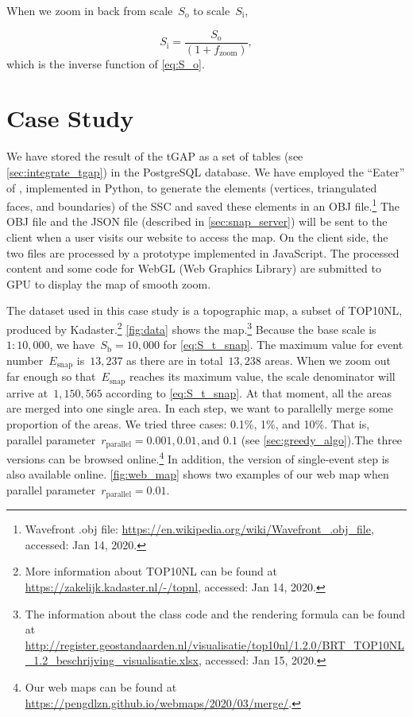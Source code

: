 \documentclass[ijgi,article,submit,moreauthors,pdftex]{Definitions/mdpi}
\begin{document}
When we zoom in back from scale~$S_\mathrm{o}$ to scale~$S_\mathrm{i}$, 

\begin{equation}
\label{eq:S_i}
S_\mathrm{i} = \frac{S_\mathrm{o}}{(1 + f_\mathrm{zoom})},
\end{equation}
which is the inverse function of \eq\ref{eq:S_o}.




\section{Case Study}
\label{sec:case_study}

We have stored the result of the tGAP 
as a set of tables (see \sect\ref{sec:integrate_tgap}) 
in the PostgreSQL database.
We have employed the ``Eater'' of \citet{Suba2014Merge},
implemented in Python, 
to generate the elements
(vertices, triangulated faces, and boundaries)
of the SSC \citep{vanOosterom2014tGAPSSC} 
and saved these elements in an OBJ file.\footnote{%
Wavefront .obj file:
\url{https://en.wikipedia.org/wiki/Wavefront_.obj_file},
accessed: Jan 14, 2020.}
%
The OBJ file and the JSON file (described in \sect\ref{sec:snap_server}) 
will be sent to the client 
when a user visits our website to access the map.
On the client side,
the two files are processed
by a prototype implemented in JavaScript.
The processed content and some code for WebGL (Web Graphics Library)
are submitted to GPU to display the map of smooth zoom.


The dataset used in this case study is a topographic map, 
a subset of TOP10NL,
produced by Kadaster.\footnote{%
More information about TOP10NL can be found at
\url{https://zakelijk.kadaster.nl/-/topnl},
accessed: Jan 14, 2020.}
%
\figs\ref{fig:data} shows the map.\footnote{%
The information about the class code and the rendering formula can be found at
\url{http://register.geostandaarden.nl/visualisatie/top10nl/1.2.0/BRT_TOP10NL_1.2_beschrijving_visualisatie.xlsx},
accessed: Jan 15, 2020.}
%
Because the base scale is $1:10{,}000$, 
we have~$S_\mathrm{b} = 10{,}000$ for \eq\ref{eq:S_t_snap}.
The maximum value for event number~$E_\mathrm{snap}$ is~$13{,}237$
as there are in total~$13{,}238$ areas.
When we zoom out far enough 
so that~$E_\mathrm{snap}$ reaches its maximum value,
the scale denominator will arrive at~$1{,}150{,}565$
according to \eq\ref{eq:S_t_snap}.
At that moment, all the areas are merged into one single area.
In each step, we want to parallelly merge some proportion of the areas.
We tried three cases: 0.1\%, 1\%, and 10\%.
That is, parallel parameter~$r_\mathrm{parallel}=0.001, 0.01, \text{and~} 0.1$ 
(see \sect\ref{sec:greedy_algo}).The three versions can be browsed online.\footnote{%
Our web maps can be found at
\url{https://pengdlzn.github.io/webmaps/2020/03/merge/}.} 
In addition, the version of single-event step is also available online.
\fig\ref{fig:web_map} shows two examples of our web map when 
parallel parameter~$r_\mathrm{parallel}=0.01$.
\end{document}
